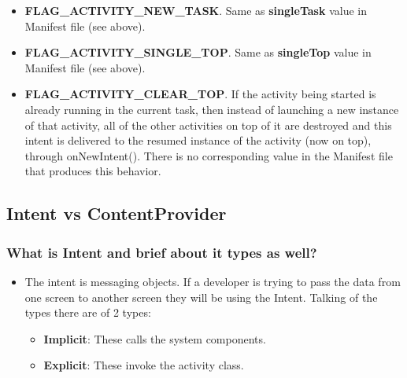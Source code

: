 \documentclass[9pt, b5paper]{article}
\begin{document}
\begin{itemize}
\begin{itemize}
\begin{itemize}
\item \textbf{FLAG\_ACTIVITY\_NEW\_TASK}. Same as \textbf{singleTask} value in Manifest file (see above).
\item \textbf{FLAG\_ACTIVITY\_SINGLE\_TOP}. Same as \textbf{singleTop} value in Manifest file (see above).
\item \textbf{FLAG\_ACTIVITY\_CLEAR\_TOP}. If the activity being started is already running in the current task, then instead of launching a new instance of that activity, all of the other activities on top of it are destroyed and this intent is delivered to the resumed instance of the activity (now on top), through onNewIntent(). There is no corresponding value in the Manifest file that produces this behavior.
\end{itemize}
\end{itemize}
\end{itemize}

\subsection{Intent vs ContentProvider}
\label{sec-1-3}
\subsubsection{What is Intent and brief about it types as well?}
\label{sec-1-3-1}
\begin{itemize}
\item The intent is messaging objects. If a developer is trying to pass the data from one screen to another screen they will be using the Intent. Talking of the types there are of 2 types:
\begin{itemize}
\item \textbf{Implicit}: These calls the system components.
\item \textbf{Explicit}: These invoke the activity class.
\end{itemize}
\end{itemize}
\end{document}
